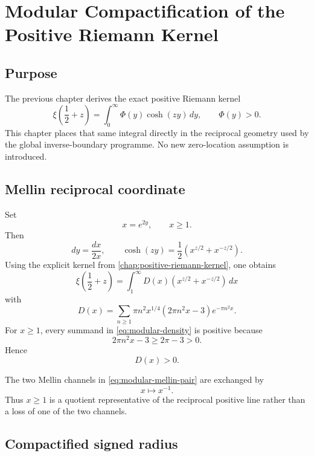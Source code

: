 \chapter{Modular Compactification of the Positive Riemann Kernel}
\label{chap:modular-kernel-compactification}


\section{Purpose}

The previous chapter derives the exact positive Riemann kernel
\[
\xi\!\left(\frac12+z\right)=\int_0^\infty \Phi(y)\cosh(zy)\,dy,
\qquad \Phi(y)>0.
\]
This chapter places that same integral directly in the reciprocal geometry used by the global inverse-boundary programme.  No new zero-location assumption is introduced.

\section{Mellin reciprocal coordinate}

Set
\[
x=e^{2y},\qquad x\ge1.
\]
Then
\[
dy=\frac{dx}{2x},
\qquad
\cosh(zy)=\frac12\left(x^{z/2}+x^{-z/2}\right).
\]
Using the explicit kernel from \cref{chap:positive-riemann-kernel}, one obtains
\begin{equation}
\boxed{
\xi\!\left(\frac12+z\right)
=\int_1^\infty D(x)
\left(x^{z/2}+x^{-z/2}\right)\,dx
}
\label{eq:modular-mellin-pair}
\end{equation}
with
\begin{equation}
\boxed{
D(x)=\sum_{n\ge1}\pi n^2x^{1/4}
\left(2\pi n^2x-3\right)e^{-\pi n^2x}.
}
\label{eq:modular-density}
\end{equation}
For $x\ge1$, every summand in \cref{eq:modular-density} is positive because
\[
2\pi n^2x-3\ge2\pi-3>0.
\]
Hence
\[
D(x)>0.
\]

The two Mellin channels in \cref{eq:modular-mellin-pair} are exchanged by
\[
x\longmapsto x^{-1}.
\]
Thus $x\ge1$ is a quotient representative of the reciprocal positive line rather than a loss of one of the two channels.

\section{Compactified signed radius}

